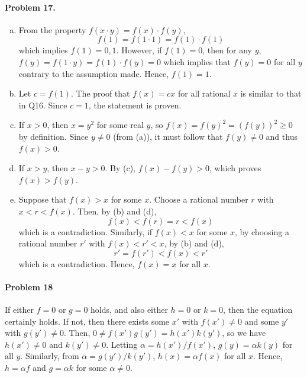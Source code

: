 \documentclass{article}
\begin{document}
\paragraph{Problem 17.}
\begin{enumerate}[(a)]
  \item From the property $f(x \cdot y) = f(x) \cdot f(y)$, \[
      f(1) = f(1 \cdot 1) = f(1) \cdot f(1)
    \] which implies $f(1) = 0, 1$. However, if $f(1) = 0$, then for any $y$,
    $f(y) = f(1 \cdot y) = f(1) \cdot f(y) = 0$ which implies that $f(y) = 0$
    for all $y$ contrary to the assumption made. Hence, $f(1) = 1$.
  \item Let $c = f(1)$. The proof that $f(x) = cx$ for all rational $x$ is
    similar to that in Q16. Since $c = 1$, the statement is proven.
  \item If $x > 0$, then $x = y^2$ for some real $y$, so $f(x) = f(y)^2 =
    (f(y))^2 \geq 0$ by definition. Since $y \neq 0$ (from (a)), it must follow
    that $f(y) \neq 0$ and thus $f(x) > 0$.
  \item If $x > y$, then $x - y > 0$. By (c), $f(x) - f(y) > 0$, which proves
    $f(x) > f(y)$.
  \item Suppose that $f(x) > x$ for some $x$. Choose a rational number $r$ with
    $x < r < f(x)$. Then, by (b) and (d), \[
      f(x) < f(r) = r < f(x)
    \] which is a contradiction. Similarly, if $f(x) < x$ for some $x$, by
    choosing a rational number $r'$ with $f(x) < r' < x$, by (b) and (d), \[
      r' = f(r') < f(x) < r'
    \] which is a contradiction. Hence, $f(x) = x$ for all $x$.
\end{enumerate}

\paragraph{Problem 18} If either $f = 0$ or $g = 0$ holds, and also either $h =
0$ or $k = 0$, then the equation certainly holds. If not, then there exists
some $x'$ with $f(x') \neq 0$ and some $y'$ with $g(y') \neq 0$. Then, $0 \neq
f(x')g(y') = h(x')k(y')$, so we have $h(x') \neq 0$ and $k(y') \neq 0$. Letting
$\alpha = h(x')/f(x')$, $g(y) = \alpha k(y)$ for all $y$. Similarly, from
$\alpha = g(y')/k(y')$, $h(x) = \alpha f(x)$ for all $x$. Hence, $h = \alpha f$
and $g = \alpha k$ for some $\alpha \neq 0$.
\end{document}
